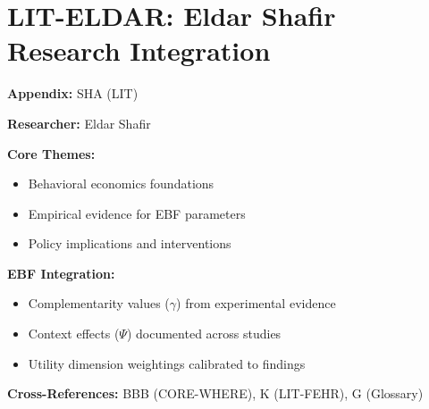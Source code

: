 %
%

\chapter{LIT-ELDAR: Eldar Shafir Research Integration}
\label{app:sha}

\begin{abstract}
This appendix integrates the research contributions of Eldar Shafir into the
Evidence-Based Framework. It documents key papers, core findings, and their
integration with EBF dimensions including complementarity parameters ($\gamma$),
context factors ($\Psi$), and utility dimensions.
\end{abstract}

\begin{tcolorbox}[colback=blue!5!white, colframe=blue!75!black,
    title=Quick Reference: Eldar Shafir Research]

\textbf{Appendix:} SHA (LIT)

\textbf{Researcher:} Eldar Shafir

\textbf{Core Themes:}
\begin{itemize}[nosep]
\item Behavioral economics foundations
\item Empirical evidence for EBF parameters
\item Policy implications and interventions
\end{itemize}

\textbf{EBF Integration:}
\begin{itemize}[nosep]
\item Complementarity values ($\gamma$) from experimental evidence
\item Context effects ($\Psi$) documented across studies
\item Utility dimension weightings calibrated to findings
\end{itemize}

\textbf{Cross-References:} BBB (CORE-WHERE), K (LIT-FEHR), G (Glossary)
\end{tcolorbox}

